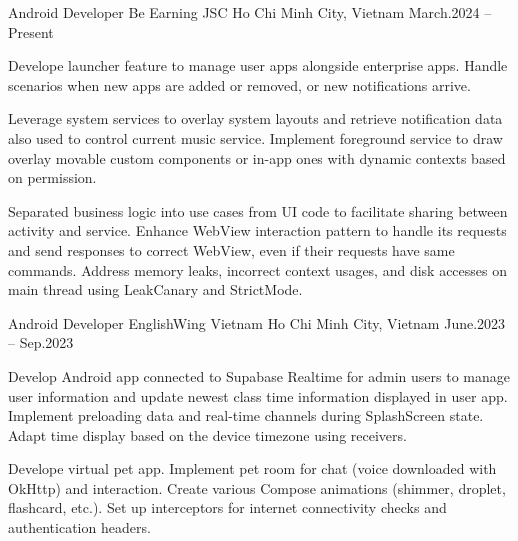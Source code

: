 \begin{cventries}

    \cventry
    {Android Developer}
    {Be Earning JSC}
    {Ho Chi Minh City, Vietnam}
    {March.2024 -- Present}
    {
        \begin{cvitems}
            \item {
                Develope launcher feature to manage user apps alongside enterprise apps.
                Handle scenarios when new apps are added or removed, or new notifications arrive.
            }
            \item {
                Leverage system services to overlay system layouts and retrieve notification data also used to control current music service.
                Implement foreground service to draw overlay movable custom components or in-app ones with dynamic contexts based on permission.
            }
            \item {
                Separated business logic into use cases from UI code to facilitate sharing between activity and service.
                Enhance WebView interaction pattern to handle its requests and send responses to correct WebView, even if their requests have same commands.
                Address memory leaks, incorrect context usages, and disk accesses on main thread using LeakCanary and StrictMode.
            }
        \end{cvitems}
    }

    \cventry
    {Android Developer}
    {EnglishWing Vietnam}
    {Ho Chi Minh City, Vietnam}
    {June.2023 -- Sep.2023}
    {
        \begin{cvitems}
            \item {
                Develop Android app connected to Supabase Realtime for admin users to manage user information and update newest class time information displayed in user app.
                Implement preloading data and real-time channels during SplashScreen state.
                Adapt time display based on the device timezone using receivers.
            }
            \item {
                Develope virtual pet app.
                Implement pet room for chat (voice downloaded with OkHttp) and interaction.
                Create various Compose animations (shimmer, droplet, flashcard, etc.).
                Set up interceptors for internet connectivity checks and authentication headers.
            }
        \end{cvitems}
    }
\end{cventries}
